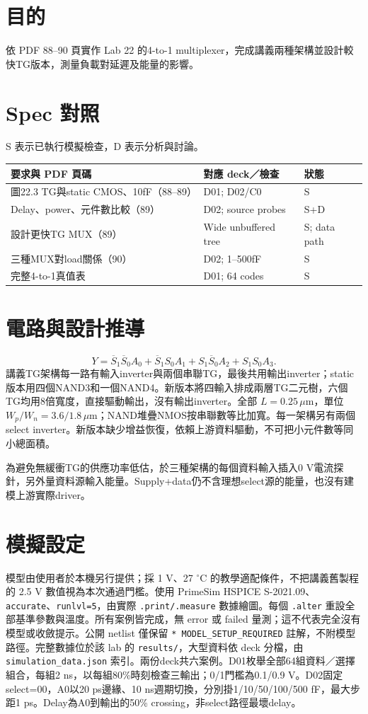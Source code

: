 \section{目的}
依 PDF 88--90 頁實作 Lab 22 的4-to-1 multiplexer，完成講義兩種架構並設計較快TG版本，測量負載對延遲及能量的影響。

\section{Spec 對照}
S 表示已執行模擬檢查，D 表示分析與討論。

\small\begin{longtable}{p{.46\linewidth}p{.30\linewidth}p{.15\linewidth}}\toprule
要求與 PDF 頁碼 & 對應 deck／檢查 & 狀態 \\ \midrule\endhead
圖22.3 TG與static CMOS、10fF（88--89） & D01; D02/C0 & S \\
Delay、power、元件數比較（89） & D02; source probes & S+D \\
設計更快TG MUX（89） & Wide unbuffered tree & S; data path \\
三種MUX對load關係（90） & D02; 1--500fF & S \\
完整4-to-1真值表 & D01; 64 codes & S \\
\bottomrule\end{longtable}\normalsize


\section{電路與設計推導}
\[Y=\overline S_1\overline S_0A_0+\overline S_1S_0A_1+S_1\overline S_0A_2+S_1S_0A_3.\]
講義TG架構每一路有輸入inverter與兩個串聯TG，最後共用輸出inverter；static版本用四個NAND3和一個NAND4。新版本將四輸入排成兩層TG二元樹，六個TG均用8倍寬度，直接驅動輸出，沒有輸出inverter。全部 $L=0.25\,\mu$m，單位 $W_p/W_n=3.6/1.8\,\mu$m；NAND堆疊NMOS按串聯數等比加寬。每一架構另有兩個select inverter。新版本缺少增益恢復，依賴上游資料驅動，不可把小元件數等同小總面積。

為避免無緩衝TG的供應功率低估，於三種架構的每個資料輸入插入0 V電流探針，另外量資料源輸入能量。Supply+data仍不含理想select源的能量，也沒有建模上游實際driver。

\section{模擬設定}
模型由使用者於本機另行提供；採 1 V、27 $^\circ$C 的教學適配條件，不把講義舊製程的 2.5 V 數值視為本次通過門檻。使用 PrimeSim HSPICE S-2021.09、\texttt{accurate}、\texttt{runlvl=5}，由實際 \texttt{.print/.measure} 數據繪圖。每個 \texttt{.alter} 重設全部基準參數與溫度。所有案例皆完成，無 error 或 failed 量測；這不代表完全沒有模型或收斂提示。公開 netlist 僅保留 \texttt{* MODEL\_SETUP\_REQUIRED} 註解，不附模型路徑。完整數據位於該 lab 的 \texttt{results/}，大型資料依 deck 分檔，由 \texttt{simulation\_data.json} 索引。兩份deck共六案例。D01枚舉全部64組資料／選擇組合，每組2 ns，以每組80\%時刻檢查三輸出；0/1門檻為0.1/0.9 V。D02固定select=00，A0以20 ps邊緣、10 ns週期切換，分別掛1/10/50/100/500 fF，最大步距1 ps。Delay為A0到輸出的50\% crossing，非select路徑最壞delay。

